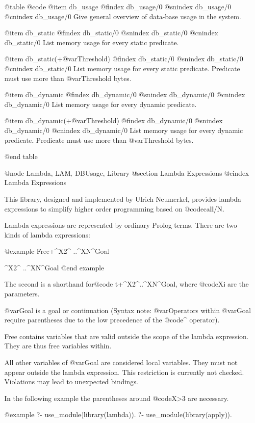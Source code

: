 {{{{{{{{@table @code
@item db_usage
@findex db_usage/0
@snindex db_usage/0
@cnindex db_usage/0
Give general overview of data-base usage in the system.

@item db_static
@findex db_static/0
@snindex db_static/0
@cnindex db_static/0
List memory usage for every static predicate.

@item db_static(+@var{Threshold})
@findex db_static/0
@snindex db_static/0
@cnindex db_static/0
List memory usage for every static predicate. Predicate must use more
than @var{Threshold} bytes.

@item db_dynamic
@findex db_dynamic/0
@snindex db_dynamic/0
@cnindex db_dynamic/0
List memory usage for every dynamic predicate.

@item db_dynamic(+@var{Threshold})
@findex db_dynamic/0
@snindex db_dynamic/0
@cnindex db_dynamic/0
List memory usage for every dynamic predicate. Predicate must use more
than @var{Threshold} bytes.

@end table

@node Lambda, LAM, DBUsage, Library
@section Lambda Expressions
@cindex Lambda Expressions


This library, designed and implemented by Ulrich Neumerkel, provides
lambda expressions to simplify higher order programming based on @code{call/N}.

Lambda expressions are represented by ordinary Prolog terms.  There are
two kinds of lambda expressions:

@example
    Free+^X2^ ..^XN^Goal

         ^X2^ ..^XN^Goal
@end example

The second is a shorthand for@code{ t+^X2^..^XN^Goal}, where @code{Xi} are the parameters.

@var{Goal} is a goal or continuation (Syntax note: @var{Operators} within @var{Goal}
require parentheses due to the low precedence of the @code{^} operator).

Free contains variables that are valid outside the scope of the lambda
expression. They are thus free variables within.

All other variables of @var{Goal} are considered local variables. They must
not appear outside the lambda expression. This restriction is
currently not checked. Violations may lead to unexpected bindings.

In the following example the parentheses around @code{X>3} are necessary.

@example
?- use_module(library(lambda)).
?- use_module(library(apply)).

}}}}}}}}
